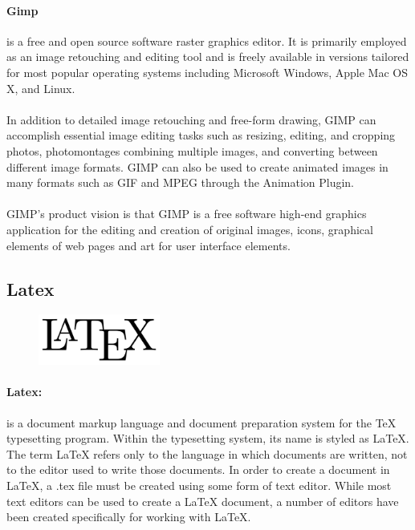 \paragraph{Gimp}
is a free and open source software raster graphics editor. It is primarily employed as an image retouching and editing tool
and is freely available in versions tailored for most popular operating systems including Microsoft Windows, Apple Mac OS X, and Linux.\par
\paragraph{}
In addition to detailed image retouching and free-form drawing, GIMP can accomplish essential image editing tasks such as resizing,
 editing, and cropping photos, photomontages combining multiple images, and converting between different image formats.
 GIMP can also be used to create animated images in many formats such as GIF and MPEG through the Animation Plugin.\par
\paragraph{}
GIMP's product vision is that GIMP is a free software high-end graphics application for the editing and creation of original images, icons, graphical elements of web pages and art for user interface elements.
\subsection{Latex}
\begin{figure}
\includegraphics[width=4cm]{./images/implementation/latex}
\end{figure}
\paragraph{Latex: } is a document markup language and document preparation system for the TeX typesetting program. 
Within the typesetting system, its name is styled as LaTeX. The term LaTeX refers only to the language in which documents are written, 
not to the editor used to write those documents. In order to create a document in LaTeX, a .tex file must be created using some form of text editor. 
While most text editors can be used to create a LaTeX document, 
a number of editors have been created specifically for working with LaTeX.\par 

